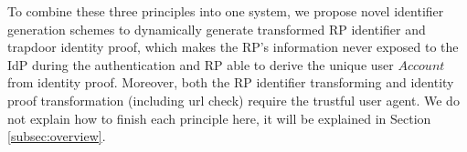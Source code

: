 To combine these three principles into one system, we propose novel identifier generation schemes to dynamically generate transformed RP identifier and trapdoor identity proof, which makes the RP's information never exposed to the IdP during the authentication and RP able to derive the unique user $Account$ from identity proof. Moreover, both the RP identifier transforming and identity proof transformation (including url check) require the trustful user agent. We do not explain how to finish each principle here, it will be explained in Section \ref{subsec:overview}.
 









